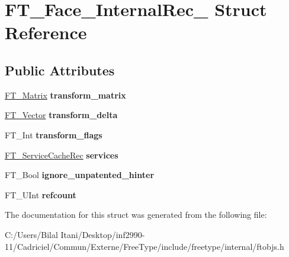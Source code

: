 \hypertarget{struct_f_t___face___internal_rec__}{}\section{F\+T\+\_\+\+Face\+\_\+\+Internal\+Rec\+\_\+ Struct Reference}
\label{struct_f_t___face___internal_rec__}
\subsection*{Public Attributes}
\begin{DoxyCompactItemize}
\item 
\hyperlink{struct_f_t___matrix__}{F\+T\+\_\+\+Matrix} {\bfseries transform\+\_\+matrix}\hypertarget{struct_f_t___face___internal_rec___ab4be2dcda098e6136f5701580d18032d}{}\label{struct_f_t___face___internal_rec___ab4be2dcda098e6136f5701580d18032d}

\item 
\hyperlink{struct_f_t___vector__}{F\+T\+\_\+\+Vector} {\bfseries transform\+\_\+delta}\hypertarget{struct_f_t___face___internal_rec___ab6c2aacdac58312273395b21b8d168c6}{}\label{struct_f_t___face___internal_rec___ab6c2aacdac58312273395b21b8d168c6}

\item 
F\+T\+\_\+\+Int {\bfseries transform\+\_\+flags}\hypertarget{struct_f_t___face___internal_rec___a2495aced35040e1b7c2bc0afcd7a920d}{}\label{struct_f_t___face___internal_rec___a2495aced35040e1b7c2bc0afcd7a920d}

\item 
\hyperlink{struct_f_t___service_cache_rec__}{F\+T\+\_\+\+Service\+Cache\+Rec} {\bfseries services}\hypertarget{struct_f_t___face___internal_rec___abc3acb3bf5db056bb9c549af04f07963}{}\label{struct_f_t___face___internal_rec___abc3acb3bf5db056bb9c549af04f07963}

\item 
F\+T\+\_\+\+Bool {\bfseries ignore\+\_\+unpatented\+\_\+hinter}\hypertarget{struct_f_t___face___internal_rec___af898fd754c36c3f34c9ce0e88eb101c9}{}\label{struct_f_t___face___internal_rec___af898fd754c36c3f34c9ce0e88eb101c9}

\item 
F\+T\+\_\+\+U\+Int {\bfseries refcount}\hypertarget{struct_f_t___face___internal_rec___a05d49c857c024a50441e17899803f56c}{}\label{struct_f_t___face___internal_rec___a05d49c857c024a50441e17899803f56c}

\end{DoxyCompactItemize}


The documentation for this struct was generated from the following file\+:\begin{DoxyCompactItemize}
\item 
C\+:/\+Users/\+Bilal Itani/\+Desktop/inf2990-\/11/\+Cadriciel/\+Commun/\+Externe/\+Free\+Type/include/freetype/internal/ftobjs.\+h\end{DoxyCompactItemize}
